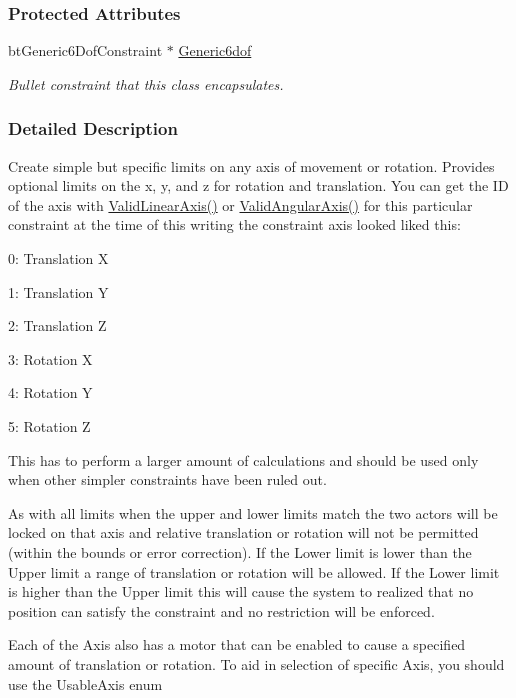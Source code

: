 \subsubsection*{Protected Attributes}
\begin{DoxyCompactItemize}
\item 
\hypertarget{classphys_1_1Generic6DofConstraint_af323a51e2e4438fc86af1f10a84cc1ba}{
btGeneric6DofConstraint $\ast$ \hyperlink{classphys_1_1Generic6DofConstraint_af323a51e2e4438fc86af1f10a84cc1ba}{Generic6dof}}
\label{classphys_1_1Generic6DofConstraint_af323a51e2e4438fc86af1f10a84cc1ba}

\begin{DoxyCompactList}\small\item\em Bullet constraint that this class encapsulates. \item\end{DoxyCompactList}\end{DoxyCompactItemize}


\subsubsection{Detailed Description}
Create simple but specific limits on any axis of movement or rotation. Provides optional limits on the x, y, and z for rotation and translation. You can get the ID of the axis with \hyperlink{classphys_1_1Generic6DofConstraint_a2148eeda4ddfa9dd14f3f16ff1799a13}{ValidLinearAxis()} or \hyperlink{classphys_1_1Generic6DofConstraint_a08d49caf73c49a4a196ed0cd2eca6a8e}{ValidAngularAxis()} for this particular constraint at the time of this writing the constraint axis looked liked this:
\begin{DoxyItemize}
\item 0: Translation X
\item 1: Translation Y
\item 2: Translation Z
\item 3: Rotation X
\item 4: Rotation Y
\item 5: Rotation Z
\end{DoxyItemize}

This has to perform a larger amount of calculations and should be used only when other simpler constraints have been ruled out. \par
 \par
 As with all limits when the upper and lower limits match the two actors will be locked on that axis and relative translation or rotation will not be permitted (within the bounds or error correction). If the Lower limit is lower than the Upper limit a range of translation or rotation will be allowed. If the Lower limit is higher than the Upper limit this will cause the system to realized that no position can satisfy the constraint and no restriction will be enforced. \par
 \par
 Each of the Axis also has a motor that can be enabled to cause a specified amount of translation or rotation. To aid in selection of specific Axis, you should use the UsableAxis enum 

